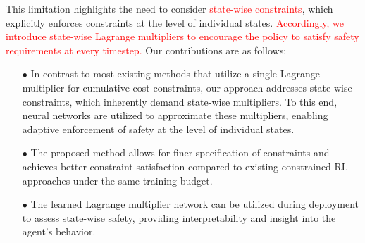 This limitation highlights the need to consider \textcolor{red}{state-wise constraints}, which explicitly enforces constraints at the level of individual states.  %
\textcolor{red}{Accordingly, we introduce state-wise Lagrange multipliers to encourage the policy to satisfy safety requirements at every timestep.}
Our contributions are as follows:
\begin{itemize}
    \item[$\bullet$] In contrast to most existing methods that utilize a single Lagrange multiplier for cumulative cost constraints, our approach addresses state-wise constraints, which inherently demand state-wise multipliers.
    To this end, neural networks are utilized to approximate these multipliers, enabling adaptive enforcement of safety at the level of individual states.
    \item[$\bullet$] The proposed method allows for finer specification of constraints and achieves better constraint satisfaction compared to existing constrained RL approaches under the same training budget.
    \item[$\bullet$] The learned Lagrange multiplier network can be utilized during deployment to assess state-wise safety, providing interpretability and insight into the agent’s behavior.
\end{itemize}
